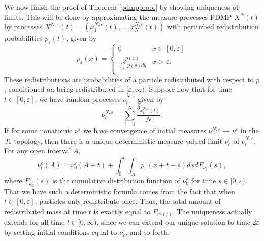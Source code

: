 We now finish the proof of Theorem \ref{pdmpproof} by showing uniqueness of limits.  This will be done by approximating the measure processes PDMP $X^N(t)$ by processes $X^{N,\varepsilon}(t) = (x_1^{N,\varepsilon}(t), \dots, x_N^{N,\varepsilon}(t))$ with perturbed redistribution probabilities $p_\varepsilon(t)$, given by
\begin{equation}
p_\varepsilon(x) = \begin{cases}0 & x \in [0,\varepsilon]  \\
\frac{p(x)}{\int_\varepsilon^\infty p(y)dy} & x >\varepsilon.\\
\end{cases}
\end{equation}
These redistributions are probabilities of a particle redistributed with respect to $p$, conditioned on being redistributed in $[\varepsilon, \infty)$.  Suppose now that for time $t \in [0,\varepsilon]$, we have random processes $\nu_t^{N,\varepsilon}$ given by  
\begin{equation}
\nu_t^{N,\varepsilon} = \sum_{i = 1}^N \frac{\delta_{x_i^{N,\varepsilon}(t)}}{N}. \end{equation}
If for some nonatomic $\nu^{\varepsilon}$ we have convergence of initial measures $\nu^{N,\varepsilon} \rightarrow \nu^\varepsilon$ in the $J1$ topology, then there is a unique deterministic measure valued limit $\nu_t^\varepsilon$ of $\nu_t^{N, \varepsilon}$.  For any open interval $A$, 
\begin{equation}
\nu_t^\varepsilon(A) = \nu_0^\varepsilon(A+t) +\int_0^t\int_Ap_\varepsilon(x+t-s)dxdF_{\nu_0^\varepsilon}(s),
\end{equation}
where $F_{\nu_0^\varepsilon}(s)$ is the cumulative distribution function of $\nu_0^\varepsilon$ for time $s \in [0,\varepsilon)$.  That we have such a deterministic formula comes from the fact that when $t \in [0,\varepsilon]$, particles only redistribute once. Thus, the total amount of  redistributed mass at time $t$ is exactly equal to $F_{\nu^\varepsilon(t)}$. The uniqueness actually extends for all time $t \in [0,\infty)$, since we can extend our unique solution to time $2\varepsilon$ by setting initial conditions equal to $\nu^\varepsilon_\varepsilon$, and so forth. 

